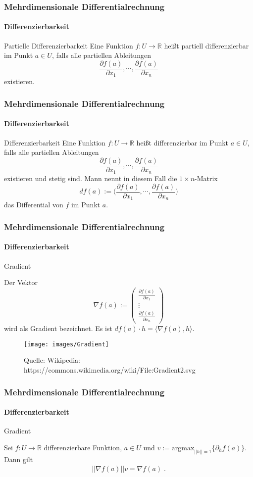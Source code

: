 \documentclass{beamer}
\begin{document}
\begin{frame}
    \frametitle{Mehrdimensionale Differentialrechnung}
\framesubtitle{Differenzierbarkeit}
    \begin{block}{Partielle Differenzierbarkeit }
Eine Funktion  $f: U \to \mathbb{R}$ heißt partiell differenzierbar im Punkt $a \in U$, falls alle partiellen Ableitungen 
$$\frac{\partial f(a)}{\partial x_1}, \cdots , \frac{\partial f(a)}{\partial x_n}$$ 
existieren.
\end{block}


 \end{frame}


\begin{frame}
    \frametitle{Mehrdimensionale Differentialrechnung}
\framesubtitle{Differenzierbarkeit}
    \begin{block}{Differenzierbarkeit}
Eine Funktion $f: U \to \mathbb{R}$ heißt  differenzierbar im Punkt $a \in U$, falls alle partiellen Ableitungen 
$$\frac{\partial f(a)}{\partial x_1}, \cdots, \frac{\partial f(a)}{\partial x_n}$$
 existieren und stetig sind.  Mann nennt  in diesem Fall die $1 \times n$-Matrix 
$$df(a) := \biggl( \frac{\partial f(a)}{\partial x_1}, \cdots, \frac{\partial f(a)}{\partial x_n} \biggr)$$
das Differential von $f$ im Punkt $a$. 
\end{block}


 \end{frame}
\begin{frame}
    \frametitle{Mehrdimensionale Differentialrechnung}
\framesubtitle{Differenzierbarkeit}
    \begin{block}{Gradient}

Der Vektor 
$$\nabla f (a) := \begin{pmatrix}  \frac{\partial f(a)}{\partial x_1} \\  \vdots \\ \frac{\partial f(a)}{\partial x_n}  \end{pmatrix}$$
wird als Gradient bezeichnet. Es ist $df(a) \cdot h = \langle \nabla f (a) , h \rangle$.
\end{block}
\begin{figure}[H]
      \centering
    \texttt{[image: images/Gradient]}
      \caption{Quelle: Wikipedia: https://commons.wikimedia.org/wiki/File:Gradient2.svg}
\end{figure}


 \end{frame}


\begin{frame}
    \frametitle{Mehrdimensionale Differentialrechnung}
\framesubtitle{Differenzierbarkeit}
    \begin{block}{Gradient}

Sei   $f: U \to \mathbb{R}$ differenzierbare Funktion,  $a \in U$ und $v := \text{argmax}_{ ||h|| = 1 } \{ \partial_h f(a) \}$.
Dann gilt 
\begin{align*}
|| \nabla f(a) || v =  \nabla f(a) \; .
\end{align*} 
\end{block}

 \end{frame}
\end{document}
